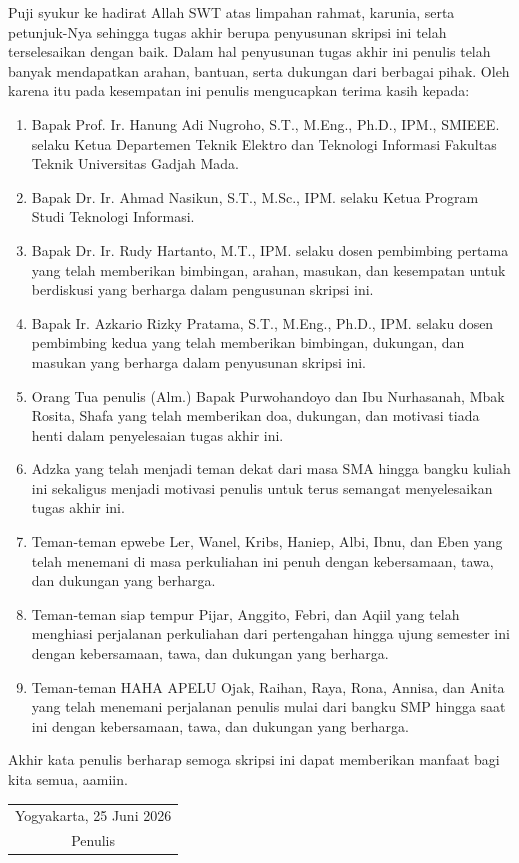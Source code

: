 Puji syukur ke hadirat Allah SWT atas limpahan rahmat, karunia, 
serta petunjuk-Nya sehingga tugas akhir berupa penyusunan skripsi ini 
telah terselesaikan dengan baik. Dalam hal penyusunan tugas akhir ini 
penulis telah banyak mendapatkan arahan, bantuan, serta dukungan dari 
berbagai pihak. Oleh karena itu pada kesempatan ini penulis mengucapkan 
terima kasih kepada:


\begin{enumerate}
	\item Bapak Prof. Ir. Hanung Adi Nugroho, S.T., M.Eng., Ph.D., IPM., SMIEEE. selaku Ketua Departemen Teknik Elektro dan Teknologi Informasi Fakultas Teknik Universitas Gadjah Mada.
	
	\item Bapak Dr. Ir. Ahmad Nasikun, S.T., M.Sc., IPM. selaku Ketua Program Studi Teknologi Informasi.
	
	\item Bapak Dr. Ir. Rudy Hartanto, M.T., IPM. selaku dosen pembimbing pertama yang telah memberikan bimbingan, arahan, masukan, dan kesempatan untuk berdiskusi yang berharga dalam pengusunan skripsi ini.
	
	\item Bapak Ir. Azkario Rizky Pratama, S.T., M.Eng., Ph.D., IPM. selaku dosen pembimbing kedua yang telah memberikan bimbingan, dukungan, dan masukan yang berharga dalam penyusunan skripsi ini.
		
	\item Orang Tua penulis (Alm.) Bapak Purwohandoyo dan Ibu Nurhasanah, Mbak Rosita, Shafa yang telah memberikan doa, dukungan, dan motivasi tiada henti dalam penyelesaian tugas akhir ini.
	
	\item Adzka yang telah menjadi teman dekat dari masa SMA hingga bangku kuliah ini sekaligus menjadi motivasi penulis untuk terus semangat menyelesaikan tugas akhir ini.
	
	\item Teman-teman epwebe Ler, Wanel, Kribs, Haniep, Albi, Ibnu, dan Eben yang telah menemani di masa perkuliahan ini penuh dengan kebersamaan, tawa, dan dukungan yang berharga.
	
	\item Teman-teman siap tempur Pijar, Anggito, Febri, dan Aqiil yang telah menghiasi perjalanan perkuliahan dari pertengahan hingga ujung semester ini dengan kebersamaan, tawa, dan dukungan yang berharga.
	
	\item Teman-teman HAHA APELU Ojak, Raihan, Raya, Rona, Annisa, dan Anita yang telah menemani perjalanan penulis mulai dari bangku SMP hingga saat ini dengan kebersamaan, tawa, dan dukungan yang berharga.

\end{enumerate}

Akhir kata penulis berharap semoga skripsi ini dapat memberikan manfaat 
bagi kita semua, aamiin.

\begin{flushright}
	\begin{tabular}{c}
		Yogyakarta, 25 Juni 2026
		\vspace{1cm} \\
		Penulis
	\end{tabular}
\end{flushright}